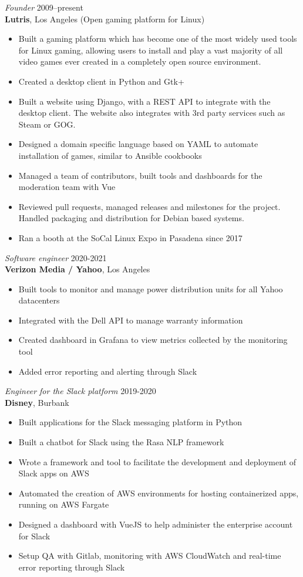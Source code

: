 \documentclass[line,resmargin]{res}
\begin{document}
\begin{resume}
{\sl Founder\/} \hfill 2009--present\\
{\bf Lutris}, Los Angeles (Open gaming platform for Linux)
\begin{itemize} \itemsep -2pt
\item Built a gaming platform which has become one of the most widely used tools for Linux gaming, allowing users to install and play a vast majority of all video games ever created in a completely open source environment.
\item Created a desktop client in Python and Gtk+
\item Built a website using Django, with a REST API to integrate with the desktop client. The website also integrates with 3rd party services such as Steam or GOG.
\item Designed a domain specific language based on YAML to automate installation of games, similar to Ansible cookbooks
\item Managed a team of contributors, built tools and dashboards for the moderation team with Vue
\item Reviewed pull requests, managed releases and milestones for the project. Handled packaging and distribution for Debian based systems.
\item Ran a booth at the SoCal Linux Expo in Pasadena since 2017
\end{itemize}

{\sl Software engineer\/} \hfill 2020-2021\\
{\bf Verizon Media / Yahoo}, Los Angeles
\begin{itemize} \itemsep -2pt
\item Built tools to monitor and manage power distribution units for all Yahoo datacenters
\item Integrated with the Dell API to manage warranty information
\item Created dashboard in Grafana to view metrics collected by the monitoring tool
\item Added error reporting and alerting through Slack
\end{itemize}

{\sl Engineer for the Slack platform\/} \hfill 2019-2020\\
{\bf Disney}, Burbank
\begin{itemize} \itemsep -2pt
\item Built applications for the Slack messaging platform in Python
\item Built a chatbot for Slack using the Rasa NLP framework
\item Wrote a framework and tool to facilitate the development and deployment of Slack apps on AWS
\item Automated the creation of AWS environments for hosting containerized apps, running on AWS Fargate
\item Designed a dashboard with VueJS to help administer the enterprise account for Slack
\item Setup QA with Gitlab, monitoring with AWS CloudWatch and real-time error reporting through Slack
\end{itemize}


\end{resume}
\end{document}
